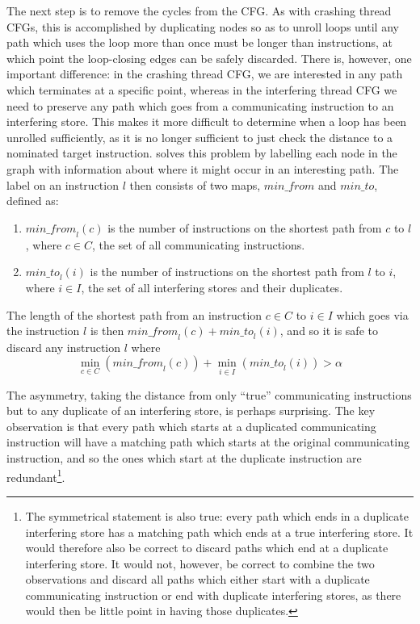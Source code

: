 The next step is to remove the cycles from the CFG.  As with crashing
thread CFGs, this is accomplished by duplicating nodes so as to unroll
loops until any path which uses the loop more than once must be longer
than \backref{$\alpha$} instructions, at which point the loop-closing
edges can be safely discarded.  There is, however, one important
difference: in the crashing thread CFG, we are interested in any path
which terminates at a specific point, whereas in the interfering
thread CFG we need to preserve any path which goes from a
communicating instruction to an interfering store.  This makes it more
difficult to determine when a loop has been unrolled sufficiently, as
it is no longer sufficient to just check the distance to a nominated
target instruction.  {\Technique} solves this problem by labelling
each node in the graph with information about where it might occur in
an interesting path.  The label on an instruction $l$ then consists of
two maps, $\mathit{min\_from}$ and $\mathit{min\_to}$, defined as:

\begin{enumerate}
\item
  $\mathit{min\_from}_l(c)$ is the number of instructions on the
  shortest path from $c$ to $l$, where $c \in C$, the set of all
  communicating instructions.
\item
  $\mathit{min\_to}_l(i)$ is the number of instructions on the
  shortest path from $l$ to $i$, where $i \in I$, the set of all
  interfering stores and their duplicates.
\end{enumerate}

The length of the shortest path from an instruction $c \in C$ to $i
\in I$ which goes via the instruction $l$ is then
$\mathit{min\_from}_l(c) + \mathit{min\_to}_l(i)$, and so it is safe
to discard any instruction $l$ where
\begin{displaymath}
\min_{c \in C}\left(\mathit{min\_from}_l(c)\right) + \min_{i \in I}\left(\mathit{min\_to}_l(i)\right) > \alpha
\end{displaymath}

The asymmetry, taking the distance from only ``true'' communicating
instructions but to any duplicate of an interfering store, is perhaps
surprising.  The key observation is that every path which starts at a
duplicated communicating instruction will have a matching path which
starts at the original communicating instruction, and so the ones
which start at the duplicate instruction are redundant\footnote{The
  symmetrical statement is also true: every path which ends in a
  duplicate interfering store has a matching path which ends at a true
  interfering store.  It would therefore also be correct to discard
  paths which end at a duplicate interfering store.  It would not,
  however, be correct to combine the two observations and discard all
  paths which either start with a duplicate communicating instruction
  or end with duplicate interfering stores, as there would then be
  little point in having those duplicates.}.

